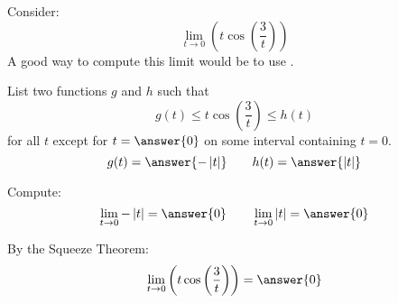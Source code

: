 \documentclass{ximera}
\author{Bart Snapp}
\begin{document}
\begin{exercise}


Consider:
\[
\lim_{t\to 0} \left(t \cos \left(\frac{3}{t}\right)\right)
\]
A good way to compute this limit would be to use .
\begin{exercise}
List two functions $g$ and $h$ such that
\[
g(t)\le t \cos \left(\frac{3}{t}\right) \le h(t)
\]
for all $t$ except for $t=\answer{0}$ on some interval containing $t=0$.
\[
g(t)=\answer{-\left| t\right|}\qquad h(t) =\answer{\left| t\right|}
\]
\begin{exercise}
Compute:
\[
\lim_{t \to 0}-\left| t\right| = \answer{0}\qquad \lim_{t\to 0}\left| t\right| = \answer{0}
\]
\begin{exercise}
By the Squeeze Theorem:
\[
\lim_{t\to 0} \left(t \cos \left(\frac{3}{t}\right)\right) = \answer{0}
\]
\end{exercise}
\end{exercise}
\end{exercise}
\end{exercise}
\end{document}
